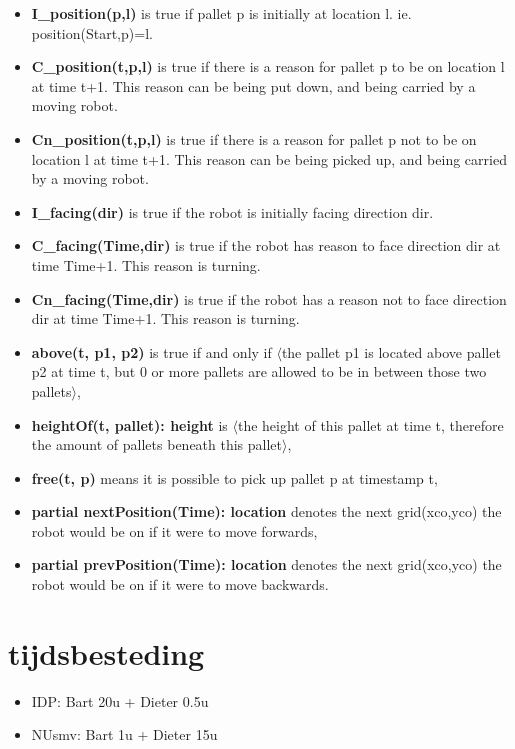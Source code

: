 \documentclass[paper=a4, fontsize=11pt]{scrartcl} %
\numberwithin{equation}{section} %
\numberwithin{figure}{section} %
\numberwithin{table}{section} %
\begin{document}
\begin{itemize}
	\item \textbf{I\_position(p,l)} is true if pallet p is initially at location l. ie. position(Start,p)=l.
	\item \textbf{C\_position(t,p,l)} is true if there is a reason for pallet p to be on location l at time t+1. This reason can be being put down, and being carried by a moving robot.
	\item \textbf{Cn\_position(t,p,l)} is true if there is a reason for pallet p not to be on location l at time t+1. This reason can be being picked up, and being carried by a moving robot.
	\item \textbf{I\_facing(dir)} is true if the robot is initially facing direction dir.
	\item \textbf{C\_facing(Time,dir)} is true if the robot has reason to face direction dir at time Time+1. This reason is turning.
	\item \textbf{Cn\_facing(Time,dir)} is true if the robot has a reason not to face direction dir at time Time+1. This reason is turning.
	\item \textbf{above(t, p1, p2)} is true if and only if $\langle$the pallet p1 is located above pallet p2 at time t, but 0 or more pallets are allowed to be in between those two pallets$\rangle$,
	\item \textbf{heightOf(t, pallet): height} is $\langle$the height of this pallet at time t, therefore the amount of pallets beneath this pallet$\rangle$,
	\item \textbf{free(t, p)} means it is possible to pick up pallet p at timestamp t,
	\item \textbf{partial nextPosition(Time): location} denotes the next grid(xco,yco) the robot would be on if it were to move forwards,
	\item \textbf{partial prevPosition(Time): location} denotes the next grid(xco,yco) the robot would be on if it were to move backwards.
\end{itemize}

\section{tijdsbesteding}
 \begin{itemize}
	\item IDP: Bart 20u + Dieter 0.5u
	\item NUsmv: Bart 1u + Dieter 15u
 \end{itemize}
\end{document}
